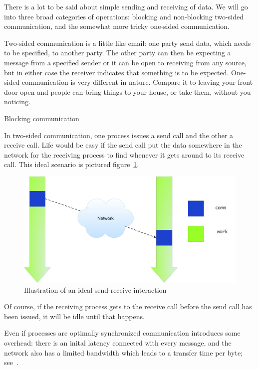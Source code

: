There is a lot to be said about simple sending and receiving of
data. We will go into three broad categories of operations: blocking
and non-blocking two-sided communication, and the somewhat
more tricky one-sided communication.

Two-sided communication is a little like email: one party send data, 
which needs to be specified, to another party. The other party can then
be expecting a message from a specified sender or it can be open
to receiving from any source, but in either case the receiver
indicates that something is to be expected. 
One-sided communication is very different in nature. Compare it to leaving your
front-door open and people can bring things to your house, or take them,
without you noticing.

 {Blocking communication}

In two-sided communication, one process issues a send call and the
other a receive call. Life would be easy if the send call put the data
somewhere in the network for the receiving process to find whenever it
gets around to its receive call. This ideal scenario is pictured
figure~\ref{fig:send-ideal}.
\begin{figure}[ht]
\includegraphics[scale=.1]{graphics/send-ideal}
\caption{Illustration of an ideal send-receive interaction}
\label{fig:send-ideal}
\end{figure}
Of course, if the receiving process gets to the receive call before
the send call has been issued, it will be idle until that happens.

Even if processes are optimally synchronized communication introduces
some overhead: there is an inital latency connected with every
message, and the network also has a limited bandwidth which leads to a
transfer time per byte; see~.

